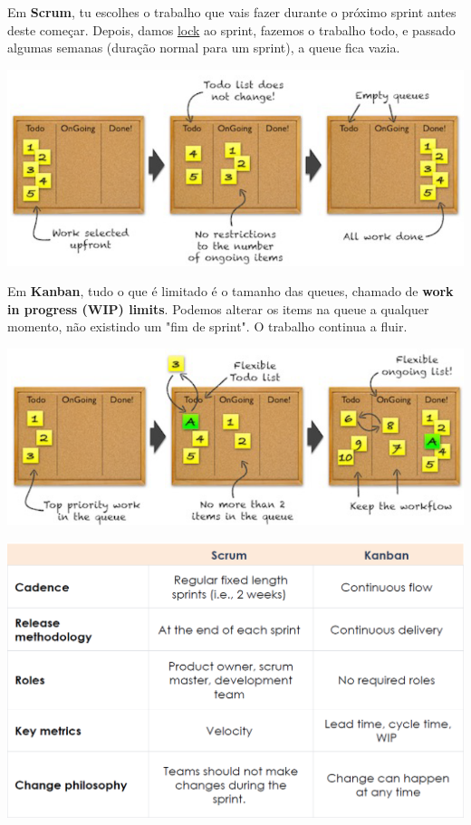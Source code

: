 \documentclass{article}
\begin{document}
Em \textbf{Scrum}, tu escolhes o trabalho que vais fazer durante o
próximo sprint antes deste começar. Depois, damos \uline{lock}
ao sprint, fazemos o trabalho todo, e passado algumas semanas
(duração normal para um sprint), a queue fica vazia.

\begin{center}
  \includegraphics[scale=0.48]{30}
\end{center}

Em \textbf{Kanban}, tudo o que é limitado é o tamanho das queues,
chamado de \textbf{work in progress (WIP) limits}. Podemos alterar
os items na queue a qualquer momento, não existindo
um "fim de sprint". O trabalho continua a fluir.  

\begin{center}
  \includegraphics[scale=0.48]{31}
\end{center}


\pagebreak

\begin{center}
  \includegraphics[scale=0.4]{32}
\end{center}
\end{document}
